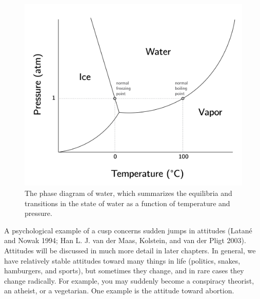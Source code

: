 \documentclass[
  a4paper,
  DIV=11,
  numbers=noendperiod,
  oneside]{scrreprt}
\begin{document}
\begin{figure}

{\centering \includegraphics{media/ch3/ch3-12__figure24.png}

}

\caption{\label{fig-ch3-img12-old-24}The phase diagram of water, which
summarizes the equilibria and transitions in the state of water as a
function of temperature and pressure.}

\end{figure}

A psychological example of a cusp concerns sudden jumps in attitudes
(Latané and Nowak 1994; Han L. J. van der Maas, Kolstein, and van der
Pligt 2003). Attitudes will be discussed in much more detail in later
chapters. In general, we have relatively stable attitudes toward many
things in life (politics, snakes, hamburgers, and sports), but sometimes
they change, and in rare cases they change radically. For example, you
may suddenly become a conspiracy theorist, an atheist, or a vegetarian.
One example is the attitude toward abortion.
\end{document}
